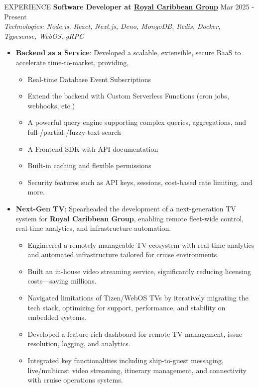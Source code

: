 \documentclass{resume}
\begin{document}
\begin{rSection}{EXPERIENCE}
    \textbf{Software Developer at \href{https://www.royalcaribbeangroup.com/}{Royal Caribbean Group}} \hfill Mar 2025 - Present\\
    \textit{Technologies: Node.js, React, Next.js, Deno, MongoDB, Redis, Docker, Typesense, WebOS, gRPC}
    \begin{itemize}
        \itemsep -3pt {}
        \item \textbf{Backend as a Service}: Developed a scalable, extensible, secure BaaS to accelerate time-to-market, providing,
              \begin{itemize}
                  \itemsep -3pt {}
                  \item Real-time Database Event Subscriptions
                  \item Extend the backend with Custom Serverless Functions (cron jobs, webhooks, etc.)
                  \item A powerful query engine supporting complex queries, aggregations, and full-/partial-/fuzzy-text search
                  \item A Frontend SDK with API documentation
                  \item Built-in caching and flexible permissions
                  \item Security features such as API keys, sessions, cost-based rate limiting, and more.
              \end{itemize}
        \item \textbf{Next-Gen TV}: Spearheaded the development of a next-generation TV system for \textbf{Royal Caribbean Group}, enabling remote fleet-wide control, real-time analytics, and infrastructure automation.
              \begin{itemize}
                  \itemsep -3pt
                  \item Engineered a remotely manageable TV ecosystem with real-time analytics and automated infrastructure tailored for cruise environments.
                  \item Built an in-house video streaming service, significantly reducing licensing costs—saving millions.
                  \item Navigated limitations of Tizen/WebOS TVs by iteratively migrating the tech stack, optimizing for support, performance, and stability on embedded systems.
                  \item Developed a feature-rich dashboard for remote TV management, issue resolution, logging, and analytics.
                  \item Integrated key functionalities including ship-to-guest messaging, live/multicast video streaming, itinerary management, and connectivity with cruise operations systems.
              \end{itemize}
    \end{itemize}


\end{rSection}
\end{document}
